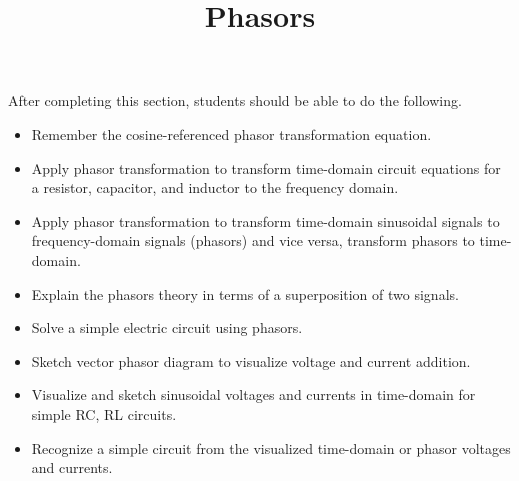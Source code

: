 \documentclass{ximera}
\title{Phasors}
\begin{document}
\begin{abstract}
\end{abstract}

\maketitle

\begin{sectionOutcomes}

After completing this section, students should be able to do the following.

\begin{itemize}
\item Remember the cosine-referenced phasor transformation equation.
\item Apply phasor transformation to transform time-domain circuit equations for a resistor, capacitor, and inductor to the frequency domain.
\item Apply phasor transformation to transform time-domain sinusoidal signals to frequency-domain signals (phasors) and vice versa, transform phasors to time-domain.
\item Explain the phasors theory in terms of a superposition of two signals.
\item Solve a simple electric circuit using phasors.
\item Sketch vector phasor diagram to visualize voltage and current addition.
\item Visualize and sketch sinusoidal voltages and currents in time-domain for simple RC, RL circuits.
\item Recognize a simple circuit from the visualized time-domain or phasor voltages and currents.
\end{itemize}

\end{sectionOutcomes}
\end{document}
